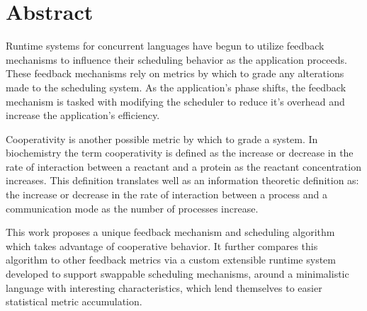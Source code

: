 \newcommand{\etc} {\emph{etc.\/}}
\newcommand{\etal}{\emph{et~al.\/}}
\newcommand{\eg}  {\emph{e.g.\/}}
\newcommand{\ie}  {\emph{i.e.\/}}


\section*{Abstract}
Runtime systems for concurrent languages have begun to utilize feedback mechanisms to influence their
scheduling behavior as the application proceeds. These feedback mechanisms rely on metrics by which to
grade any alterations made to the scheduling system. As the application's phase shifts, the feedback mechanism
is tasked with modifying the scheduler to reduce it's overhead and increase the application's efficiency.

Cooperativity is another possible metric by which to grade a system. In biochemistry the term cooperativity
is defined as the increase or decrease in the rate of interaction between a reactant and a protein as
the reactant concentration increases. This definition translates well as an information theoretic definition
as: the increase or decrease in the rate of interaction between a process and a communication mode as the
number of processes increase. 

This work proposes a unique feedback mechanism and scheduling algorithm which takes advantage of cooperative behavior.
It further compares this algorithm to other feedback metrics via a custom extensible runtime system developed to
support swappable scheduling mechanisms, around a minimalistic language with interesting characteristics, which 
lend themselves to easier statistical metric accumulation.
\vfill{}

\setcounter{page}{0} 
\newpage{}


